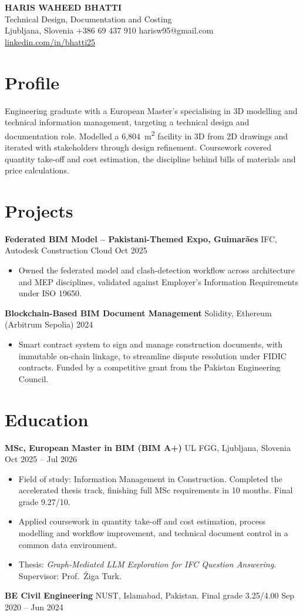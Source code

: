 \documentclass[a4paper,10.5pt]{article}
\newcommand{\datefill}{\dotfill}
\newcommand{\entry}[3]{\vspace{2.5pt}\noindent\textbf{#1} \textbar{} #2 \datefill{} #3\par\vspace{0.5pt}}
\newcommand{\ROLELINE}{Technical Design, Documentation and Costing}
\newcommand{\projGuimaraes}{%
\entry{Federated BIM Model -- Pakistani-Themed Expo, Guimar\~aes}{IFC, Autodesk Construction Cloud}{Oct 2025}
\begin{itemize}
  \item Owned the federated model and clash-detection workflow across architecture
        and MEP disciplines, validated against Employer's Information Requirements
        under ISO 19650.
\end{itemize}}
\newcommand{\projBlockchain}{%
\entry{Blockchain-Based BIM Document Management}{Solidity, Ethereum (Arbitrum Sepolia)}{2024}
\begin{itemize}
  \item Smart contract system to sign and manage construction documents, with
        immutable on-chain linkage, to streamline dispute resolution under FIDIC
        contracts. Funded by a competitive grant from the
        Pakistan Engineering Council.
\end{itemize}}
\begin{document}
\begin{center}
  {\LARGE\bfseries HARIS WAHEED BHATTI}\\[2pt]
  {\large \ROLELINE}\\[3pt]
  Ljubljana, Slovenia \textbar{} +386 69 437 910 \textbar{} harisw95@gmail.com\\
  \href{https://linkedin.com/in/bhatti25}{linkedin.com/in/bhatti25}
\end{center}
\vspace{-4pt}

\section{Profile}

\noindent Engineering graduate with a European Master's specialising in 3D modelling
and technical information management, targeting a technical design and documentation
role. Modelled a 6,804~m\textsuperscript{2} facility in 3D from 2D drawings and
iterated with stakeholders through design refinement. Coursework covered quantity
take-off and cost estimation, the discipline behind bills of materials and price
calculations.

\section{Projects}

 \projGuimaraes \projBlockchain

\section{Education}
\entry{MSc, European Master in BIM (BIM A+)}{UL FGG, Ljubljana, Slovenia}{Oct 2025 -- Jul 2026}
\begin{itemize}
  \item Field of study: Information Management in Construction. Completed the
        accelerated thesis track, finishing full MSc requirements in 10 months.
        Final grade 9.27/10.
  \item Applied coursework in quantity take-off and cost estimation, process
        modelling and workflow improvement, and technical document control in a
        common data environment.
  \item Thesis: \textit{Graph-Mediated LLM Exploration for IFC Question Answering}.
        Supervisor: Prof.~\v{Z}iga Turk.
\end{itemize}

\entry{BE Civil Engineering}{NUST, Islamabad, Pakistan. Final grade 3.25/4.00}{Sep 2020 -- Jun 2024}
\end{document}
